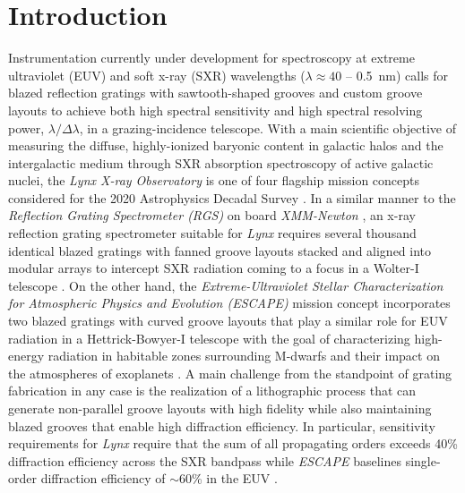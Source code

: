 \documentclass{aastex63}
\begin{document}
\section{Introduction} \label{sec:introduction}
Instrumentation currently under development for spectroscopy at extreme ultraviolet (EUV) and soft x-ray (SXR) wavelengths ($\lambda \approx 40$ -- 0.5~nm) calls for blazed reflection gratings with sawtooth-shaped grooves and custom groove layouts to achieve both high spectral sensitivity and high spectral resolving power, $\lambda / \Delta \lambda$, in a grazing-incidence telescope. 
With a main scientific objective of measuring the diffuse, highly-ionized baryonic content in galactic halos and the intergalactic medium through SXR absorption spectroscopy of active galactic nuclei, the \emph{Lynx X-ray Observatory} is one of four flagship mission concepts considered for the 2020 Astrophysics Decadal Survey \citep{Gaskin19}. %
In a similar manner to the \emph{Reflection Grating Spectrometer (RGS)} on board \emph{XMM-Newton} \citep{denHerder01}, an x-ray reflection grating spectrometer suitable for \emph{Lynx} requires several thousand identical blazed gratings with fanned groove layouts stacked and aligned into modular arrays to intercept SXR radiation coming to a focus in a Wolter-I telescope \citep{McEntaffer19}. 
On the other hand, the \emph{Extreme-Ultraviolet Stellar Characterization for Atmospheric Physics and Evolution (ESCAPE)} mission concept incorporates two blazed gratings with curved groove layouts that play a similar role for EUV radiation in a Hettrick-Bowyer-I telescope with the goal of characterizing high-energy radiation in habitable zones surrounding M-dwarfs and their impact on the atmospheres of exoplanets \citep{France19}. 
A main challenge from the standpoint of grating fabrication in any case is the realization of a lithographic process that can generate non-parallel groove layouts with high fidelity while also maintaining blazed grooves that enable high diffraction efficiency. %
In particular, sensitivity requirements for \emph{Lynx} require that the sum of all propagating orders exceeds 40\% diffraction efficiency across the SXR bandpass while \emph{ESCAPE} baselines single-order diffraction efficiency of $\sim$60\% in the EUV \citep{McEntaffer19,France19}. 
\end{document}
